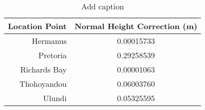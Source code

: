 \begin{table}[htbp]
  \centering
  \caption{Add caption}
    \begin{tabular}{rc}
    \toprule
    \multicolumn{1}{c}{\textbf{Location Point}} & \textbf{Normal Height Correction (m)} \\
    \midrule
    Hermanus & 0.00015733 \\
    Pretoria & 0.29258539 \\
    Richards Bay & 0.00001063 \\
    Thohoyandou & 0.06003760 \\
    Ulundi & 0.05325595 \\
    \bottomrule
    \end{tabular}%
  \label{tab:addlabel}%
\end{table}%
